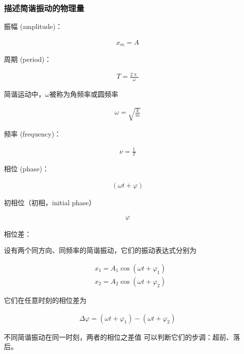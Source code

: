 \documentclass[12pt, a4paper]{article}
\numberwithin{equation}{section}
\begin{document}
\subsubsection{描述简谐振动的物理量}

    振幅 (amplitude)：

    \begin{align}
        x_m = A
    \end{align}

    周期 (period)：

    \begin{align}
        T = \frac{2 \uppi}{\omega}
    \end{align}

    简谐运动中，\(\omega\)被称为角频率或圆频率

    \begin{align}
        \omega = \sqrt{\frac{k}{m}}
    \end{align}

    频率 (frequency)：

    \begin{align}
        \nu = \frac{1}{T}
    \end{align}

    相位 (phase)：

    \begin{align}
        \left(\omega t + \varphi\right)
    \end{align}

    初相位（初相，initial phase）

    \begin{align}
        \varphi
    \end{align}

    相位差：

    设有两个同方向、同频率的简谐振动，它们的振动表达式分别为
    
    $$
        \begin{aligned}
            & x_1=A_1 \cos \left(\omega t+\varphi_1\right) \\
            & x_2=A_2 \cos \left(\omega t+\varphi_2\right)
        \end{aligned}
    $$

    它们在任意时刻的相位差为

    \begin{align}
        \Delta \varphi = \left(\omega t+\varphi_1\right) - \left(\omega t+\varphi_2\right)
    \end{align}

    不同简谐振动在同一时刻，两者的相位之差值
    可以判断它们的步调：超前、落后。
\end{document}
